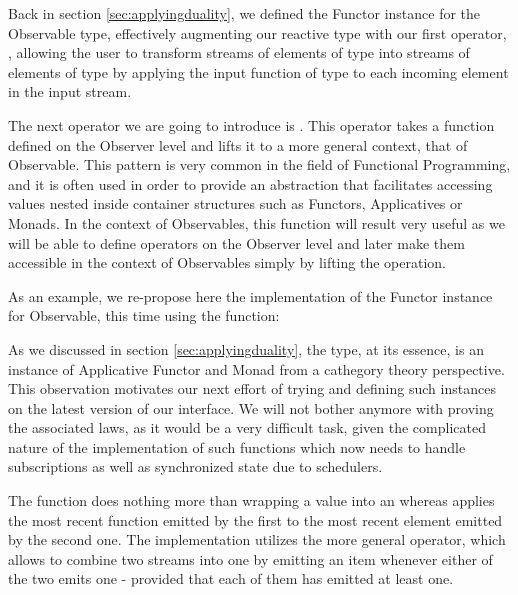 Back in section \ref{sec:applyingduality}, we defined the Functor instance for the Observable type, effectively augmenting our reactive type with our first operator, , allowing the user to transform streams of elements of type  into streams of elements of type  by applying the input function of type  to each incoming element in the input stream.

The next operator we are going to introduce is . This operator takes a function defined on the Observer level and lifts it to a more general context, that of Observable\cite{lift}. This pattern is very common in the field of Functional Programming, and it is often used in order to provide an abstraction that facilitates accessing values nested inside container structures such as Functors, Applicatives or Monads. In the context of Observables, this function will result very useful as we will be able to define operators on the Observer level and later make them accessible in the context of Observables simply by lifting the operation.


As an example, we re-propose here the implementation of the Functor instance for Observable, this time using the  function:


As we discussed in section \ref{sec:applyingduality}, the  type, at its essence, is an instance of Applicative Functor and Monad from a cathegory theory perspective. This observation motivates our next effort of trying and defining such instances on the latest version of our interface. We will not bother anymore with proving the associated laws, as it would be a very difficult task, given the complicated nature of the implementation of such functions which now needs to handle subscriptions as well as synchronized state due to schedulers.


The function  does nothing more than wrapping a value into an  whereas \code{(<*>)} applies the most recent function emitted by the first  to the most recent element emitted by the second one. The implementation utilizes the more general  operator, which allows to combine two streams into one by emitting an item whenever either of the two emits one - provided that each of them has emitted at least one. 

